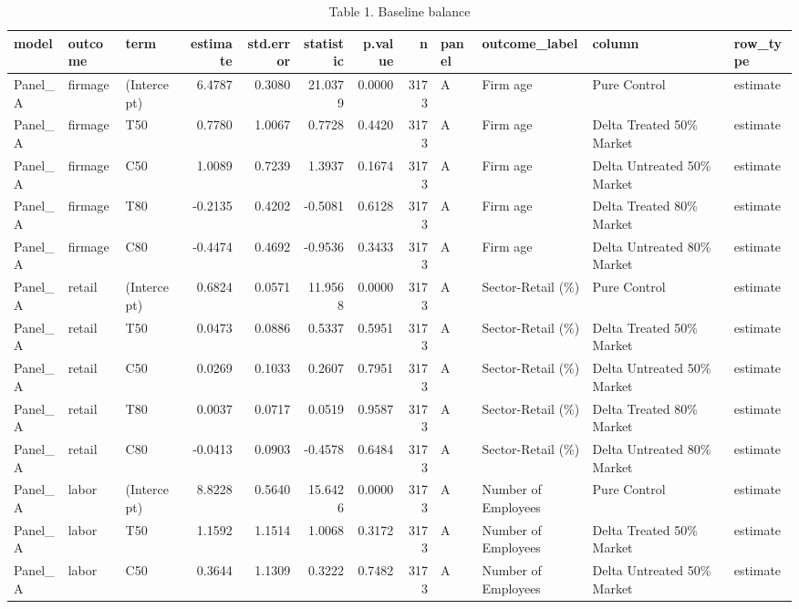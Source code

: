 \begin{table}

\caption{Table 1. Baseline balance}
\centering
\begin{tabular}[t]{lllrrrrrllll}
\toprule
model & outcome & term & estimate & std.error & statistic & p.value & n & panel & outcome\_label & column & row\_type\\
\midrule
Panel\_A & firmage & (Intercept) & 6.4787 & 0.3080 & 21.0379 & 0.0000 & 3173 & A & Firm age & Pure Control & estimate\\
Panel\_A & firmage & T50 & 0.7780 & 1.0067 & 0.7728 & 0.4420 & 3173 & A & Firm age & Delta Treated 50\% Market & estimate\\
Panel\_A & firmage & C50 & 1.0089 & 0.7239 & 1.3937 & 0.1674 & 3173 & A & Firm age & Delta Untreated 50\% Market & estimate\\
Panel\_A & firmage & T80 & -0.2135 & 0.4202 & -0.5081 & 0.6128 & 3173 & A & Firm age & Delta Treated 80\% Market & estimate\\
Panel\_A & firmage & C80 & -0.4474 & 0.4692 & -0.9536 & 0.3433 & 3173 & A & Firm age & Delta Untreated 80\% Market & estimate\\
\addlinespace
Panel\_A & retail & (Intercept) & 0.6824 & 0.0571 & 11.9568 & 0.0000 & 3173 & A & Sector-Retail (\%) & Pure Control & estimate\\
Panel\_A & retail & T50 & 0.0473 & 0.0886 & 0.5337 & 0.5951 & 3173 & A & Sector-Retail (\%) & Delta Treated 50\% Market & estimate\\
Panel\_A & retail & C50 & 0.0269 & 0.1033 & 0.2607 & 0.7951 & 3173 & A & Sector-Retail (\%) & Delta Untreated 50\% Market & estimate\\
Panel\_A & retail & T80 & 0.0037 & 0.0717 & 0.0519 & 0.9587 & 3173 & A & Sector-Retail (\%) & Delta Treated 80\% Market & estimate\\
Panel\_A & retail & C80 & -0.0413 & 0.0903 & -0.4578 & 0.6484 & 3173 & A & Sector-Retail (\%) & Delta Untreated 80\% Market & estimate\\
\addlinespace
Panel\_A & labor & (Intercept) & 8.8228 & 0.5640 & 15.6426 & 0.0000 & 3173 & A & Number of Employees & Pure Control & estimate\\
Panel\_A & labor & T50 & 1.1592 & 1.1514 & 1.0068 & 0.3172 & 3173 & A & Number of Employees & Delta Treated 50\% Market & estimate\\
Panel\_A & labor & C50 & 0.3644 & 1.1309 & 0.3222 & 0.7482 & 3173 & A & Number of Employees & Delta Untreated 50\% Market & estimate\\

\end{tabular}
\end{table}
